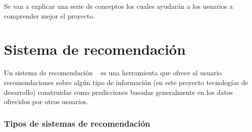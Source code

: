 
Se van a explicar una serie de conceptos los cuales ayudarán a los usuarios a comprender mejor el proyecto.

\section{Sistema de recomendación}
Un sistema de recomendación ~\cite{wiki:sistemas_recomendacion} es una herramienta que ofrece al usuario recomendaciones sobre algún tipo de información (en este proyecto tecnologías de desarrollo) construidas como predicciones basadas generalmente en los datos ofrecidos por otros usuarios.

\subsubsection{Tipos de sistemas de recomendación \cite{wiki:filtroModelos}} 
